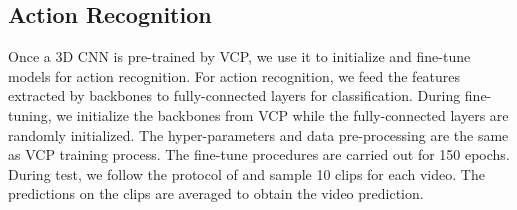 \documentclass[letterpaper]{article}
\begin{document}
\subsection{Action Recognition}
\begin{table}
    \centering
\caption{Comparison of action recognition accuracy on UCF101 and HMDB51.}
    \label{fig:state of the art}
\end{table}

Once a 3D CNN is pre-trained by VCP, we use it to initialize and fine-tune  models for action recognition.
For action recognition, we feed the features extracted by backbones to fully-connected layers for classification. During fine-tuning, we initialize the backbones from VCP while the fully-connected layers are randomly initialized. The hyper-parameters and data pre-processing are the same as VCP training process.
The fine-tune procedures are carried out for 150 epochs. During test, we follow the protocol of \cite{tran2018closer} and sample 10 clips for each video. The predictions on the clips are averaged to obtain the video prediction.
\end{document}
